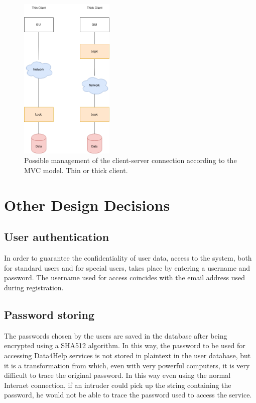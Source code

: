 \begin{figure}[H]
  \begin{center}
  	\includegraphics[width=0.4\textwidth]{./img/client_server.png}
    \hspace{0.05\linewidth}
    \centering
    \caption{Possible management of the client-server connection according to the MVC model. Thin or thick client.}
		\label{img:client_server}
    \end{center}
\end{figure}


\section{Other Design Decisions}
\subsection{User authentication}
In order to guarantee the confidentiality of user data, access to the system, both for standard users and for special users, takes place by entering a username and password.
The username used for access coincides with the email address used during registration.

\subsection{Password storing}
The passwords chosen by the users are saved in the database after being encrypted using a SHA512 algorithm.
In this way, the password to be used for accessing Data4Help services is not stored in plaintext in the user database, but it is a transformation from which, even with very powerful computers, it is very difficult to trace the original password.
In this way even using the normal Internet connection, if an intruder could pick up the string containing the password, he would not be able to trace the password used to access the service.

